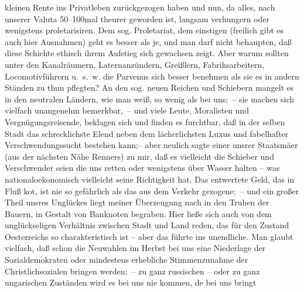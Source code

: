 \begin{ledgroupsized}[t]{13cm}
               kleinen Rente ins Privatleben zurückgezogen haben und nun, da alles, nach unserer
               Valuta 50–100mal theurer geworden ist, langsam verhungern oder wenigstens
               proletarisiren. Dem sog. Proletariat, dem einstigen (freilich gibt es auch hier
               Ausnahmen) geht es besser als je, und man darf nicht behaupten, daß diese Schichte
               ethisch ihrem Aufstieg sich gewachsen zeigt. Aber \introOben{}warum\introOben{}
               sollten unter den Kanalräumern, Laternanzündern, Greißlern, Fabriksarbeitern,
               Locomotivführern u. s. w. die Parvenus sich besser benehmen als sie es in andern
               Ständen zu thun pflegten? {\pb}An den sog. neuen
               Reichen und Schiebern mangelt es in den neutralen Ländern, wie man weiß, so wenig als
               bei uns; – sie machen sich vielfach unangenehm bemerkbar, – und viele Leute,
               Moralisten und Vergnügungsreisende, beklagen sich und finden es furchtbar, daß in der
               selben Stadt das schrecklichste Elend neben dem lächerlichsten Luxus und fabelhafter
               Verschwendungssucht bestehen kann;– aber neulich sagte einer unsrer Staatsmä{\geminationn}er
               (aus der nächsten Nähe Renners) zu mir, daß es
               vielleicht die Schieber und Verschwender seien die uns retten oder wenigstens über
               Wasser halten – was nationaloekonomisch vielleicht seine Richtigkeit hat. Das
               entwertete Geld, das in Fluß ko{\geminationm}t, ist nie so gefährlich
               als das aus dem Verkehr gezogene; – und ein großer Theil unsres Unglückes liegt
               meiner Überzeugung nach in den Truhen der Bauern, in Gestalt von Banknoten begraben.
               Hier ließe sich auch von dem unglückseligen Verhältnis zwischen Stadt {\pb}und Land reden, das für den Zustand Oesterreichs so charakteristisch ist – aber das
               führte ins unendliche. Man glaubt vielfach, daß schon die Neuwahlen im Herbst bei uns
               eine Niederlage der Sozialdemokraten oder mindestens erhebliche Stimmenzunahme der
               Christlichsozialen bringen werden; – zu ganz russischen – oder zu ganz ungarischen
               Zuständen wird es bei uns nie kommen, de{\geminationn} bei uns bringt

\end{ledgroupsized}
